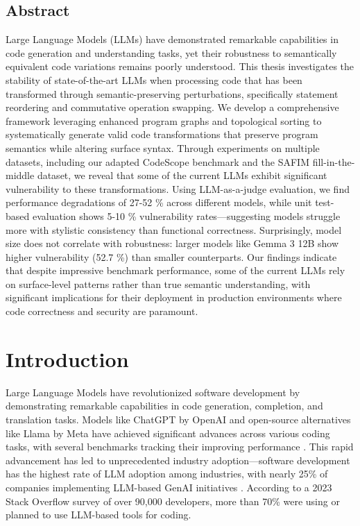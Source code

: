 \documentclass[%
thesis=student,%
coverpage=false,%
titlepage=false,%
headmarks=true, %
english,%
font=libertine, %
math=newpxtx, %
BCOR=5mm,%
coverBCOR=11mm%
]{tum-templates/book/tumbook}
\begin{document}
\section*{Abstract}
Large Language Models (LLMs) have demonstrated remarkable capabilities in code generation and understanding tasks, yet their robustness to semantically equivalent code variations remains poorly understood. This thesis investigates the stability of state-of-the-art LLMs when processing code that has been transformed through semantic-preserving perturbations, specifically statement reordering and commutative operation swapping. We develop a comprehensive framework leveraging enhanced program graphs and topological sorting to systematically generate valid code transformations that preserve program semantics while altering surface syntax. Through experiments on multiple datasets, including our adapted CodeScope benchmark and the SAFIM fill-in-the-middle dataset, we reveal that some of the current LLMs exhibit significant vulnerability to these transformations. Using LLM-as-a-judge evaluation, we find performance degradations of 27-52 \% across different models, while unit test-based evaluation shows 5-10 \% vulnerability rates—suggesting models struggle more with stylistic consistency than functional correctness. Surprisingly, model size does not correlate with robustness: larger models like Gemma 3 12B show higher vulnerability (52.7 \%) than smaller counterparts. Our findings indicate that despite impressive benchmark performance, some of the current LLMs rely on surface-level patterns rather than true semantic understanding, with significant implications for their deployment in production environments where code correctness and security are paramount.
\cleardoublepage{}

\tableofcontents

\mainmatter{}

\chapter{Introduction}

Large Language Models have revolutionized software development by demonstrating remarkable capabilities in code generation, completion, and translation tasks. Models like ChatGPT by OpenAI and open-source alternatives like Llama by Meta have achieved significant advances across various coding tasks, with several benchmarks tracking their improving performance \cite{Chen2021} \cite{Yan2023}. This rapid advancement has led to unprecedented industry adoption—software development has the highest rate of LLM adoption among industries, with nearly 25\% of companies implementing LLM-based GenAI initiatives \cite{France2024}. According to a 2023 Stack Overflow survey of over 90,000 developers, more than 70\% were using or planned to use LLM-based tools for coding.
\end{document}
